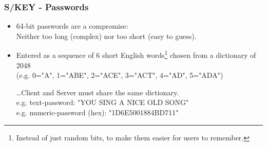 \subsubsection*{S/KEY - Passwords}
\begin{itemize}
    \item 64-bit passwords are a compromise:\\\hspace*{3cm}Neither too long (complex) nor too short (easy to guess).
    \item Entered as a sequence of 6 short English words\footnote{Instead of just random bits, to make them easier for users to remember.} chosen from a dictionary of 2048 \\(e.g. 0="A", 1="ABE", 2="ACE", 3="ACT", 4="AD", 5="ADA")
    
    \dots Client and Server must share the same dictionary.
    \\\hspace*{1cm} e.g. text-password: "YOU SING A NICE OLD SONG"
    \\\hspace*{1cm} e.g. numeric-password (hex): "1D6E5001884BD711"
\end{itemize}

